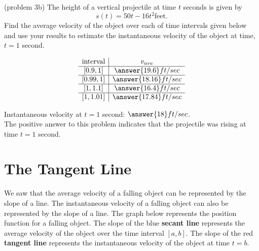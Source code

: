 \documentclass[handout]{ximera}
\begin{document}
\begin{problem}(problem 3b)
The height of a vertical projectile at time $t$ seconds is given by
\[
s(t) = 50t - 16t^2 \text{feet}.
\]
Find the average velocity of the object over each of time intervals given below and use your 
results to estimate the instantaneous velocity
of the object at time, $t = 1$ second.

\[
\begin{array}{ c | c  }
   \text{interval}& v_{ave} \\ 
	\hline
	[0.9, 1] & \answer{19.6}ft/sec \\
	\hline
	[0.99, 1] & \answer{18.16}ft/sec \\
	\hline
	[1, 1.1] & \answer{16.4}ft/sec \\
	\hline
	[1, 1.01] & \answer{17.84}ft/sec
\end{array}
\]


Instantaneous velocity at $t = 1$ second: $\answer{18}ft/sec$.\\
The positive answer to this problem indicates that the projectile was rising at time $t= 1$ second.

\end{problem}

\section{The Tangent Line}
We saw that the average velocity of a falling object can be represented by the slope of a line. 
The instantaneous velocity of a falling object can also be represented by the slope of a line.
The graph below represents the position function for a falling object.  
The slope of the blue \textbf{secant line} represents the average velocity of the object over the time interval $[a,b]$.
The slope of the red \textbf{tangent line} represents the instantaneous velocity of the object at time $t = b$.
\end{document}
